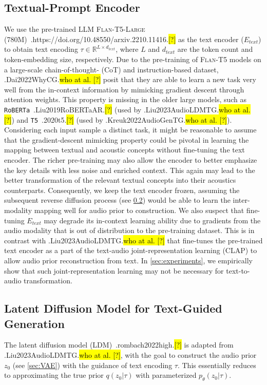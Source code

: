 \documentclass{article}
\let\realcite\cite
\renewcommand{\cite}[1]{\ifx.#1.\hl{[?]}\else\realcite{#1}\fi}
\let\realcitet\citet
\renewcommand{\citet}[1]{\ifx.#1.\hl{who at al. [?]}\else\realcitet{#1}\fi}
\begin{document}
\subsection{Textual-Prompt Encoder}
\label{sec:TE}

We use the pre-trained LLM \textsc{Flan-T5-Large} (780M)~\cite{https://doi.org/10.48550/arxiv.2210.11416} as the text encoder ($E_{text}$) to obtain text encoding $\tau\in \mathbb{R}^{L\times d_{text}}$, where $L$ and $d_{text}$ are the token count and token-embedding size, respectively. Due to the pre-training of \textsc{Flan-T5} models on a large-scale chain-of-thought- (CoT) and instruction-based dataset, \citet{Dai2022WhyCG} posit that they are able to learn a new task very well from the in-context information by mimicking gradient descent through attention weights. This property is missing in the older large models, such as \texttt{RoBERTa}~\cite{Liu2019RoBERTaAR} (used by \citet{Liu2023AudioLDMTG}) and \texttt{T5}~\cite{2020t5} (used by \citet{Kreuk2022AudioGenTG}). Considering each input sample a distinct task, it might be reasonable to assume that the gradient-descent mimicking property could be pivotal in learning the mapping between textual and acoustic concepts without fine-tuning the text encoder. The richer pre-training may also allow the encoder to better emphasize the key details with less noise and enriched context. This again may lead to the better transformation of the relevant textual concepts into their acoustics counterparts. Consequently, we keep the text encoder frozen, assuming the subsequent reverse diffusion process (see \cref{sec:LDM}) would be able to learn the inter-modality mapping well for audio prior to construction. We also suspect that fine-tuning $E_{text}$ may degrade its in-context learning ability due to gradients from the audio modality that is out of distribution to the pre-training dataset. This is in contrast with \citet{Liu2023AudioLDMTG} that fine-tunes the pre-trained text encoder as a part of the text-audio joint-representation learning (CLAP) to allow audio prior reconstruction from text. In \cref{sec:experiments}, we empirically show that such joint-representation learning may not be necessary for text-to-audio transformation.


\subsection{Latent Diffusion Model for Text-Guided Generation}
\label{sec:LDM}

The latent diffusion model (LDM)~\cite{rombach2022high} is adapted from \citet{Liu2023AudioLDMTG}, with the goal to construct the audio prior $z_0$ (see \cref{sec:VAE}) with the guidance of text encoding $\tau$. This essentially reduces to approximating the true prior $q(z_0|\tau)$ with parameterized $p_\theta(z_0|\tau)$.
\end{document}
